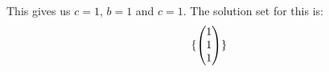 \documentclass[12pt]{article}
\newenvironment{abc}{\begin{enumerate}[label={\bf(\alph*)}]}{\end{enumerate}}
\newcommand\m[2][]{
	\ifthenelse{\equal {#1} {}}
		{\begin{pmatrix*}[r]#2\end{pmatrix*}}
		{\left(\begin{array}{#1}#2\end{array}\right)}
}
\begin{document}
\begin{abc}
\begin{item}
	This gives us $c = 1$, $b = 1$ and $c = 1$. The solution set for this is:
	\begin{equation}
		\{ \m{1 \\ 1 \\ 1} \}
	\end{equation}
	\end{item}
\end{abc}
\end{document}
